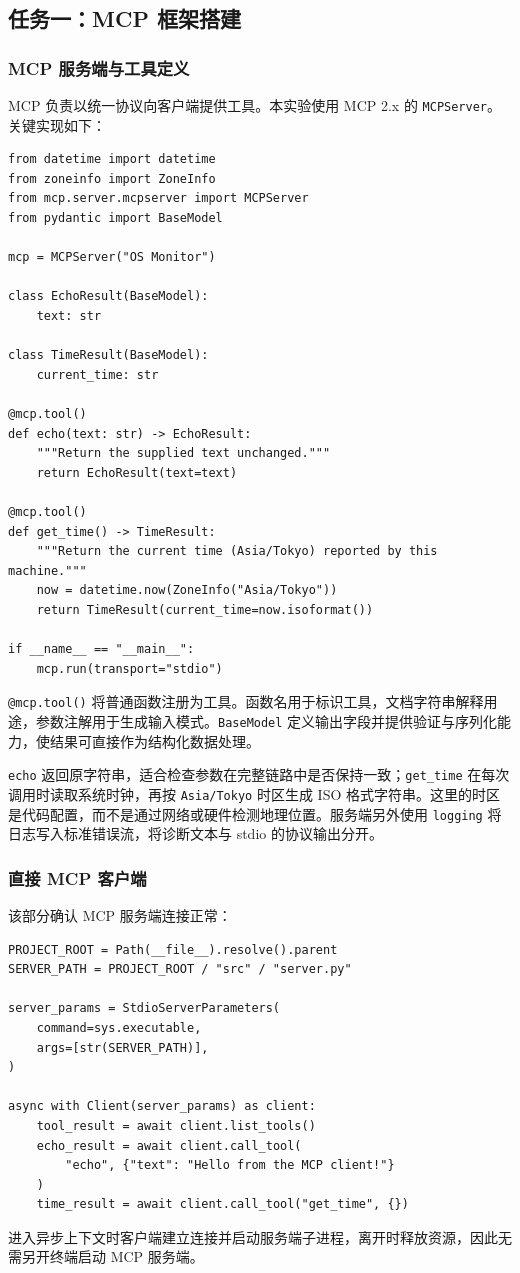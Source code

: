 \documentclass[12pt,a4paper]{ctexart}
\newcommand{\subtask}{任务一：MCP 框架搭建}
\begin{document}
\subsection{\subtask}
\subsubsection{MCP 服务端与工具定义}
MCP 负责以统一协议向客户端提供工具。本实验使用 MCP 2.x 的 \texttt{MCPServer}。关键实现如下：
\begin{lstlisting}
from datetime import datetime
from zoneinfo import ZoneInfo
from mcp.server.mcpserver import MCPServer
from pydantic import BaseModel

mcp = MCPServer("OS Monitor")

class EchoResult(BaseModel):
    text: str

class TimeResult(BaseModel):
    current_time: str

@mcp.tool()
def echo(text: str) -> EchoResult:
    """Return the supplied text unchanged."""
    return EchoResult(text=text)

@mcp.tool()
def get_time() -> TimeResult:
    """Return the current time (Asia/Tokyo) reported by this machine."""
    now = datetime.now(ZoneInfo("Asia/Tokyo"))
    return TimeResult(current_time=now.isoformat())

if __name__ == "__main__":
    mcp.run(transport="stdio")
\end{lstlisting}
\texttt{@mcp.tool()} 将普通函数注册为工具。函数名用于标识工具，文档字符串解释用途，参数注解用于生成输入模式。\texttt{BaseModel} 定义输出字段并提供验证与序列化能力，使结果可直接作为结构化数据处理。

\texttt{echo} 返回原字符串，适合检查参数在完整链路中是否保持一致；\texttt{get\_time} 在每次调用时读取系统时钟，再按 \texttt{Asia/Tokyo} 时区生成 ISO 格式字符串。这里的时区是代码配置，而不是通过网络或硬件检测地理位置。服务端另外使用 \texttt{logging} 将日志写入标准错误流，将诊断文本与 stdio 的协议输出分开。

\subsubsection{直接 MCP 客户端}
该部分确认 MCP 服务端连接正常：
\begin{lstlisting}
PROJECT_ROOT = Path(__file__).resolve().parent
SERVER_PATH = PROJECT_ROOT / "src" / "server.py"

server_params = StdioServerParameters(
    command=sys.executable,
    args=[str(SERVER_PATH)],
)

async with Client(server_params) as client:
    tool_result = await client.list_tools()
    echo_result = await client.call_tool(
        "echo", {"text": "Hello from the MCP client!"}
    )
    time_result = await client.call_tool("get_time", {})
\end{lstlisting}
进入异步上下文时客户端建立连接并启动服务端子进程，离开时释放资源，因此无需另开终端启动 MCP 服务端。
\end{document}
